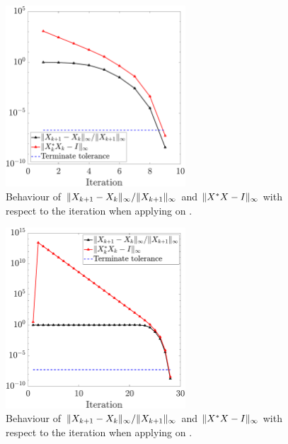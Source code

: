 \begin{figure}[H]
    \centering
    \includegraphics[width=0.6\textwidth]{../code/randn100.pdf}
    \caption{Behaviour of $\|{X_{k+1} - X_{k}}\|_\infty/\|{X_{k+1}}\|_\infty$ and $\|{X^* X - I}\|_\infty$ with respect to the iteration when applying  on .}
\end{figure}

\begin{figure}[H]
    \centering
    \includegraphics[width=0.6\textwidth]{../code/hilb6.pdf}
    \caption{Behaviour of $\|{X_{k+1} - X_{k}}\|_\infty/\|{X_{k+1}}\|_\infty$ and $\|{X^* X - I}\|_\infty$ with respect to the iteration when applying  on .}
    \label{fig:hilb6}
\end{figure}

